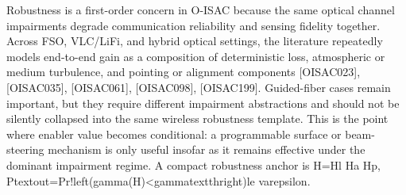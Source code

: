 {}Robustness is a first-order concern in O-ISAC because the same optical channel impairments degrade communication reliability and sensing fidelity together. Across FSO, VLC/LiFi, and hybrid optical settings, the literature repeatedly models end-to-end gain as a composition of deterministic loss, atmospheric or medium turbulence, and pointing or alignment components [O\markdownRendererUnderscore{}ISAC\markdownRendererUnderscore{}023], [O\markdownRendererUnderscore{}ISAC\markdownRendererUnderscore{}035], [O\markdownRendererUnderscore{}ISAC\markdownRendererUnderscore{}061], [O\markdownRendererUnderscore{}ISAC\markdownRendererUnderscore{}098], [O\markdownRendererUnderscore{}ISAC\markdownRendererUnderscore{}199]. Guided-fiber cases remain important, but they require different impairment abstractions and should not be silently collapsed into the same wireless robustness template. This is the point where enabler value becomes conditional: a programmable surface or beam-steering mechanism is only useful insofar as it remains effective under the dominant impairment regime.\markdownRendererParagraphSeparator
{}A compact robustness anchor is\markdownRendererParagraphSeparator
{}\markdownRendererDollarSign{}\markdownRendererDollarSign{}\markdownRendererSoftLineBreak
{}H=H\markdownRendererUnderscore{}l H\markdownRendererUnderscore{}a H\markdownRendererUnderscore{}p,\markdownRendererSoftLineBreak
{}\markdownRendererDollarSign{}\markdownRendererDollarSign{}\markdownRendererSoftLineBreak
{}\markdownRendererDollarSign{}\markdownRendererDollarSign{}\markdownRendererSoftLineBreak
{}P\markdownRendererUnderscore{}\markdownRendererLeftBrace{}\markdownRendererBackslash{}text\markdownRendererLeftBrace{}out\markdownRendererRightBrace{}\markdownRendererRightBrace{}=\markdownRendererBackslash{}Pr!\markdownRendererBackslash{}left(\markdownRendererBackslash{}gamma(H)<\markdownRendererBackslash{}gamma\markdownRendererUnderscore{}\markdownRendererLeftBrace{}\markdownRendererBackslash{}text\markdownRendererLeftBrace{}th\markdownRendererRightBrace{}\markdownRendererRightBrace{}\markdownRendererBackslash{}right)\markdownRendererBackslash{}le \markdownRendererBackslash{}varepsilon.\markdownRendererSoftLineBreak
{}\markdownRendererDollarSign{}\markdownRendererDollarSign{}\markdownRendererParagraphSeparator
